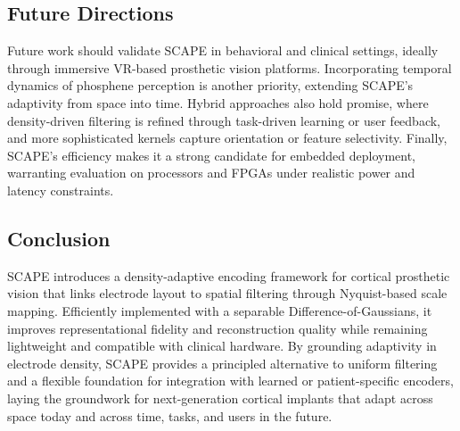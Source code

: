 \subsection{Future Directions}
Future work should validate SCAPE in behavioral and clinical settings, ideally through immersive VR-based prosthetic vision platforms. Incorporating temporal dynamics of phosphene perception is another priority, extending SCAPE’s adaptivity from space into time. Hybrid approaches also hold promise, where density-driven filtering is refined through task-driven learning or user feedback, and more sophisticated kernels capture orientation or feature selectivity. Finally, SCAPE’s efficiency makes it a strong candidate for embedded deployment, warranting evaluation on processors and FPGAs under realistic power and latency constraints.

\subsection{Conclusion}
SCAPE introduces a density-adaptive encoding framework for cortical prosthetic vision that links electrode layout to spatial filtering through Nyquist-based scale mapping. Efficiently implemented with a separable Difference-of-Gaussians, it improves representational fidelity and reconstruction quality while remaining lightweight and compatible with clinical hardware. By grounding adaptivity in electrode density, SCAPE provides a principled alternative to uniform filtering and a flexible foundation for integration with learned or patient-specific encoders, laying the groundwork for next-generation cortical implants that adapt across space today and across time, tasks, and users in the future.
